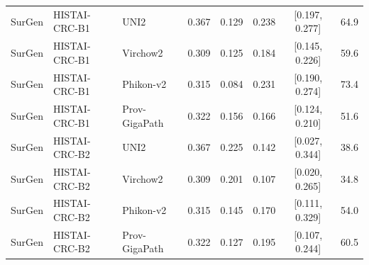 \begin{table}[H]
{\begin{tabular}{l l l c c c c c}
\midrule
SurGen & HISTAI-CRC-B1 & UNI2 & 0.367 & 0.129 & 0.238 & [0.197, 0.277] & 64.9 \\
SurGen & HISTAI-CRC-B1 & Virchow2 & 0.309 & 0.125 & 0.184 & [0.145, 0.226] & 59.6 \\
SurGen & HISTAI-CRC-B1 & Phikon-v2 & 0.315 & 0.084 & 0.231 & [0.190, 0.274] & 73.4 \\
SurGen & HISTAI-CRC-B1 & Prov-GigaPath & 0.322 & 0.156 & 0.166 & [0.124, 0.210] & 51.6 \\
\midrule
SurGen & HISTAI-CRC-B2 & UNI2 & 0.367 & 0.225 & 0.142 & [0.027, 0.344] & 38.6 \\
SurGen & HISTAI-CRC-B2 & Virchow2 & 0.309 & 0.201 & 0.107 & [0.020, 0.265] & 34.8 \\
SurGen & HISTAI-CRC-B2 & Phikon-v2 & 0.315 & 0.145 & 0.170 & [0.111, 0.329] & 54.0 \\
SurGen & HISTAI-CRC-B2 & Prov-GigaPath & 0.322 & 0.127 & 0.195 & [0.107, 0.244] & 60.5 \\
\midrule
\bottomrule
\end{tabular}
}
\end{table}

